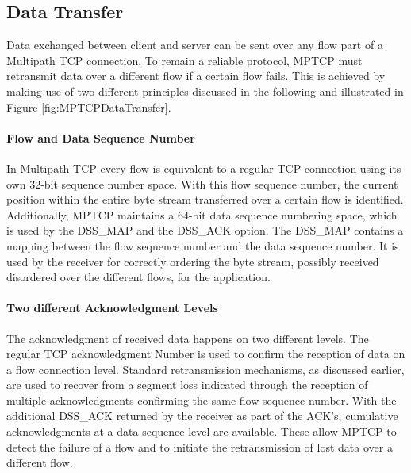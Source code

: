 \subsection*{Data Transfer}

Data exchanged between client and server can be sent over any flow part of a Multipath TCP connection. To remain a reliable protocol, MPTCP must retransmit data over a different flow if a certain flow fails. This is achieved by making use of two different principles discussed in the following and illustrated in Figure \ref{fig:MPTCPDataTransfer}.

\paragraph{Flow and Data Sequence Number}

In Multipath TCP every flow is equivalent to a regular TCP connection using its own 32-bit sequence number space. With this flow sequence number, the current position within the entire byte stream transferred over a certain flow is identified. Additionally, MPTCP maintains a 64-bit data sequence numbering space, which is used by the DSS\_MAP and the DSS\_ACK option. The DSS\_MAP contains a mapping between the flow sequence number and the data sequence number. It is used by the receiver for correctly ordering the byte stream, possibly received disordered over the different flows, for the application.

\paragraph{Two different Acknowledgment Levels}

The acknowledgment of received data happens on two different levels. The regular TCP acknowledgment Number is used to confirm the reception of data on a flow connection level. Standard retransmission mechanisms, as discussed earlier, are used to recover from a segment loss indicated through the reception of multiple acknowledgments confirming the same flow sequence number. With the additional DSS\_ACK returned by the receiver as part of the ACK's, cumulative acknowledgments at a data sequence level are available. These allow MPTCP to detect the failure of a flow and to initiate the retransmission of lost data over a different flow.

